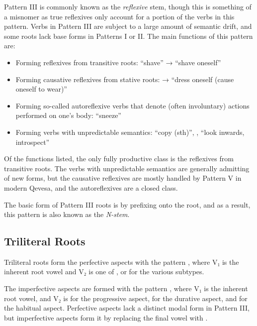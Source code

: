 \documentclass[grammar]{subfiles}
\begin{document}
Pattern III is commonly known as the \emph{reflexive} stem, though this is
something of a misnomer as true reflexives only account for a portion of the
verbs in this pattern.  Verbs in Pattern III are subject to a large amount of
semantic drift, and some roots lack base forms in Patterns I or II.  The main
functions of this pattern are: 

\begin{itemize}
  \item Forming reflexives from transitive roots:  “shave” → 
    “shave oneself”
  \item Forming causative reflexives from stative roots:  →
     “dress oneself (cause oneself to wear)”
  \item Forming so-called autoreflexive verbs that denote (often involuntary)
    actions performed on one’s body:  “sneeze”
  \item Forming verbs with unpredictable semantics:  “copy (sth)”,
    ,  “look inwards, introspect”
\end{itemize}

Of the functions listed, the only fully productive class is the reflexives from
transitive roots.  The verbs with unpredictable semantics are generally
admitting of new forms, but the causative reflexives are mostly handled by
Pattern V in modern Qevesa, and the autoreflexives are a closed class.

The basic form of Pattern III roots is by prefixing  onto the root, and as
a result, this pattern is also known as the \emph{N-stem}.


\subsection{Triliteral Roots}
\label{ssec:vm:iii_triliteral_roots}

Triliteral roots form the perfective aspects with the pattern ,
where V₁ is the inherent root vowel and V₂ is one of ,  or 
for the various subtypes.  

The imperfective aspects are formed with the pattern ,
where V₁ is the inherent root vowel, and V₂ is  for the progressive
aspect,  for the durative aspect, and  for the habitual aspect.
Perfective aspects lack a distinct modal form in Pattern III, but imperfective
aspects form it by replacing the final vowel with . 
\end{document}
